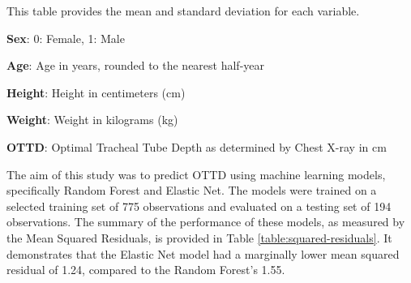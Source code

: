 \documentclass[11pt]{article}
\begin{document}
\begin{table}[h]
\caption{Descriptive Statistics of Patient Features and OTTD}
\label{table:descriptive-statistics}
\begin{threeparttable}
\renewcommand{\TPTminimum}{\linewidth}
\begin{tablenotes}
\footnotesize
\item This table provides the mean and standard deviation for each variable.
\item \textbf{Sex}: 0: Female, 1: Male
\item \textbf{Age}: Age in years, rounded to the nearest half-year
\item \textbf{Height}: Height in centimeters (cm)
\item \textbf{Weight}: Weight in kilograms (kg)
\item \textbf{OTTD}: Optimal Tracheal Tube Depth as determined by Chest X-ray in cm
\end{tablenotes}
\end{threeparttable}
\end{table}


The aim of this study was to predict OTTD using machine learning models, specifically Random Forest and Elastic Net. The models were trained on a selected training set of 775 observations and evaluated on a testing set of 194 observations. The summary of the performance of these models, as measured by the Mean Squared Residuals, is provided in Table \ref{table:squared-residuals}. It demonstrates that the Elastic Net model had a marginally lower mean squared residual of 1.24, compared to the Random Forest's 1.55. 

\begin{table}[h]
\caption{Mean Squared Residuals for Random Forest and Elastic Net}
\label{table:squared-residuals}
\begin{threeparttable}
\renewcommand{\TPTminimum}{\linewidth}
\begin{tablenotes}
\footnotesize
\item 
\end{tablenotes}
\end{threeparttable}
\end{table}
\end{document}
